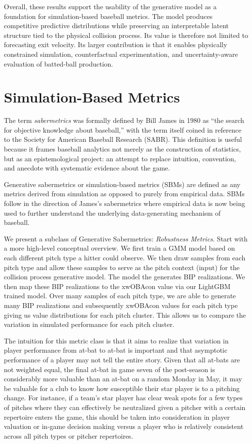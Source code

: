 \documentclass[11pt]{article}
\begin{document}
Overall, these results support the usability of the generative model as a foundation for simulation-based baseball metrics. The model produces competitive predictive distributions while preserving an interpretable latent structure tied to the physical collision process. Its value is therefore not limited to forecasting exit velocity. Its larger contribution is that it enables physically constrained simulation, counterfactual experimentation, and uncertainty-aware evaluation of batted-ball production.



\section{Simulation-Based Metrics}

The term \textit{sabermetrics} was formally defined by Bill James in 1980 as ``the search for objective knowledge about baseball,'' with the term itself coined in reference to the Society for American Baseball Research (SABR). This definition is useful because it frames baseball analytics not merely as the construction of statistics, but as an epistemological project: an attempt to replace intuition, convention, and anecdote with systematic evidence about the game.


Generative sabermetrics or simulation-based metrics (SBMs) are defined as any metrics derived from simulation as opposed to purely from empirical data. SBMs follow in the direction of James's sabermetrics where empirical data is now being used to further understand the underlying data-generating mechanism of baseball.


We present a subclass of Generative Sabermetrics: \textit{Robustness Metrics}. Start with a more high-level conceptual overview. We first train a GMM model based on each different pitch type a hitter could observe. We then draw samples from each pitch type and allow these samples to serve as the pitch context (input) for the collision process generative model. The model the generates BIP realizations. We then map these BIP realizations to the xwOBAcon value via our LightGBM trained model. Over many samples of each pitch type, we are able to generate many BIP realizations and subsequently xwOBAcon values for each pitch type giving us value distributions for each pitch cluster. This allows us to compare the variation in simulated performance for each pitch cluster. 

The intuition for this metric class is that it aims to realize that variation in player performance from at-bat to at-bat is important and that asymptotic performance of a player may not tell the entire story. Given that all at-bats are not weighted equal, the final at-bat in game seven of the post-season is considerably more valuable than an at-bat on a random Monday in May, it may be valuable for a club to know how susceptible their star player is to a pitching change. For instance, if a team's star player has clear weak spots for a few types of pitches where they can effectively be neutralized given a pitcher with a certain repertoire enters the game, this should be taken into consideration in player valuation or in-game decision making versus a player who is relatively consistent across all pitch types or pitcher repertoires.
\end{document}
